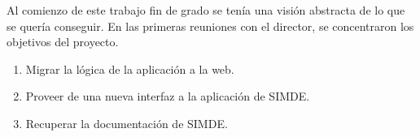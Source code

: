 Al comienzo de este trabajo fin de grado se tenía una visión abstracta de lo que
se quería conseguir. En las primeras reuniones con el director, se concentraron 
los objetivos del proyecto.

\begin{enumerate}

\item Migrar la lógica de la aplicación a la web.

\item Proveer de una nueva interfaz a la aplicación de SIMDE.

\item Recuperar la documentación de SIMDE.

\end{enumerate}